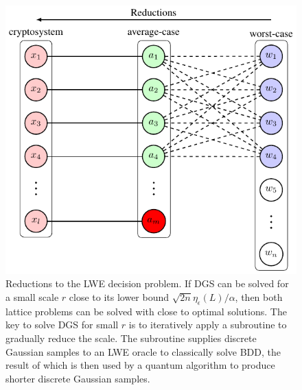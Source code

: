\documentclass[../main.tex]{subfiles}
\begin{document}
\begin{figure}[hbt!]
    \centering
    \includegraphics[page=14]{images/Lattice_crypto_tikz_folder.pdf}
    \caption{Reductions to the LWE decision problem. If DGS can be solved for a small scale $r$ close to its lower bound $\sqrt{2n} \eta_{\epsilon}(L)/\alpha$, then both lattice problems can be solved with close to optimal solutions. The key to solve DGS for small $r$ is to iteratively apply a subroutine to gradually reduce the scale. The subroutine supplies discrete Gaussian samples to an LWE oracle to classically solve BDD, the result of which is then used by a quantum algorithm to produce shorter discrete Gaussian samples.}
    \label{fig:lweReduction}
\end{figure}
\end{document}
